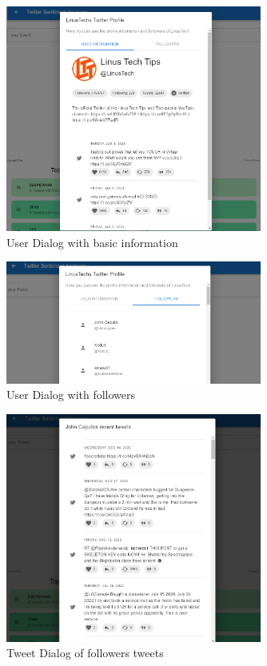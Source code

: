 \documentclass[a4paper,oneside,11pt]{scrreprt}
\begin{document}
\begin{figure}[H]
    \centering
    \caption{User Dialog with basic information}
    \includegraphics[width=0.75\textwidth]{media/3_UserScreen.png}
\end{figure}

\begin{figure}[H]
    \centering
    \caption{User Dialog with followers}
    \includegraphics[width=0.75\textwidth]{media/3_FollowersScreen.png}
\end{figure}

\begin{figure}[H]
    \centering
    \caption{Tweet Dialog of followers tweets}
    \includegraphics[width=0.75\textwidth]{media/3_FollowersTweetsScreen.png}
\end{figure}
\end{document}
